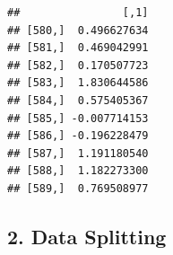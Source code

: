 \documentclass[
]{article}
\newenvironment{Shaded}{\begin{snugshade}}{\end{snugshade}}
\newcommand{\CommentTok}[1]{\textcolor[rgb]{0.56,0.35,0.01}{\textit{#1}}}
\newcommand{\DecValTok}[1]{\textcolor[rgb]{0.00,0.00,0.81}{#1}}
\newcommand{\FunctionTok}[1]{\textcolor[rgb]{0.13,0.29,0.53}{\textbf{#1}}}
\newcommand{\NormalTok}[1]{#1}
\newcommand{\OtherTok}[1]{\textcolor[rgb]{0.56,0.35,0.01}{#1}}
\newcommand{\SpecialCharTok}[1]{\textcolor[rgb]{0.81,0.36,0.00}{\textbf{#1}}}
\begin{document}
\begin{Shaded}
\end{Shaded}

\begin{verbatim}
##                [,1]
## [580,]  0.496627634
## [581,]  0.469042991
## [582,]  0.170507723
## [583,]  1.830644586
## [584,]  0.575405367
## [585,] -0.007714153
## [586,] -0.196228479
## [587,]  1.191180540
## [588,]  1.182273300
## [589,]  0.769508977
\end{verbatim}

\subsection{2. Data Splitting}\label{data-splitting-1}
\end{document}
